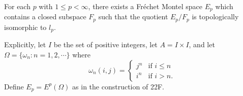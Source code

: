 For each $p$ with $1 \leq p < \infty$, there exists a Fr\'{e}chet Montel space $E_{p}$ which contains a closed subspace $F_{p}$ such that the quotient $E_{p}/F_{p}$ is topologically isomorphic to $l_{p}$.

Explicitly, let $I$ be the set of positive integers, let $A = I \times I$, and let $\Omega = \{\omega_{n} : n = 1, 2, \cdots\}$ where
$$\omega_{n}(i,j) = \begin{cases} j^{n} & \text{if } i \leq n \\ i^{n} & \text{if } i > n. \end{cases}$$
Define $E_{p} = E^{p}(\Omega)$ as in the construction of 22F.
